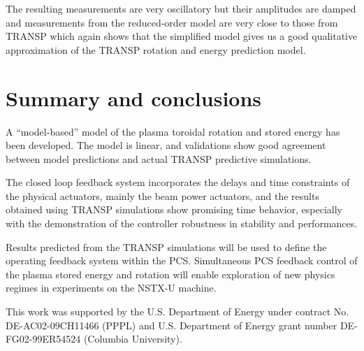 \documentclass[12pt,lot, lof]{puthesis}
\begin{document}
The resulting measurements are very oscillatory but their amplitudes are damped and measurements from the reduced-order model are very close to those from TRANSP which again shows that the simplified model gives us a good qualitative approximation of the TRANSP rotation and energy prediction model.

\section{Summary and conclusions}
\label{conclusions10}

A ``model-based'' model of the plasma toroidal rotation and stored energy has been developed. The model is linear, and validations show good agreement between  model  predictions  and  actual  TRANSP predictive simulations.

The closed loop feedback system incorporates the delays and time constraints of the physical actuators, mainly the beam power actuators, and the results obtained using TRANSP simulations show promising time behavior, especially with the demonstration of the controller robustness in stability and performances.

Results predicted from the TRANSP simulations will be used to define the operating feedback system within the PCS. Simultaneous PCS feedback control of the plasma stored energy and rotation will enable exploration of new physics regimes in experiments on the NSTX-U machine.


This work was supported by the U.S. Department of Energy under contract No. DE-AC02-09CH11466 (PPPL) and U.S. Department of Energy  grant number DE-FG02-99ER54524 (Columbia University). 






\singlespacing


\cleardoublepage
\ifdefined{}
\else
\fi
{}


%
\end{document}
